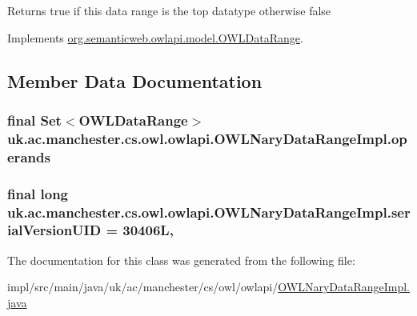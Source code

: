\begin{DoxyReturn}{Returns}
{\ttfamily true} if this data range is the top datatype otherwise {\ttfamily false} 
\end{DoxyReturn}


Implements \hyperlink{interfaceorg_1_1semanticweb_1_1owlapi_1_1model_1_1_o_w_l_data_range_aec7bb1cb42b7d8783e0410112734aa1c}{org.\-semanticweb.\-owlapi.\-model.\-O\-W\-L\-Data\-Range}.



\subsection{Member Data Documentation}
\hypertarget{classuk_1_1ac_1_1manchester_1_1cs_1_1owl_1_1owlapi_1_1_o_w_l_nary_data_range_impl_a4536392a3f3322085f03875bc3ac1ef1}{
\subsubsection[{operands}]{\setlength{\rightskip}{0pt plus 5cm}final Set$<${\bf O\-W\-L\-Data\-Range}$>$ uk.\-ac.\-manchester.\-cs.\-owl.\-owlapi.\-O\-W\-L\-Nary\-Data\-Range\-Impl.\-operands\hspace{0.3cm}{\ttfamily [private]}}}\label{classuk_1_1ac_1_1manchester_1_1cs_1_1owl_1_1owlapi_1_1_o_w_l_nary_data_range_impl_a4536392a3f3322085f03875bc3ac1ef1}
\hypertarget{classuk_1_1ac_1_1manchester_1_1cs_1_1owl_1_1owlapi_1_1_o_w_l_nary_data_range_impl_adf263be401e7e99a553ccb0cb28418ea}{
\subsubsection[{serial\-Version\-U\-I\-D}]{\setlength{\rightskip}{0pt plus 5cm}final long uk.\-ac.\-manchester.\-cs.\-owl.\-owlapi.\-O\-W\-L\-Nary\-Data\-Range\-Impl.\-serial\-Version\-U\-I\-D = 30406\-L\hspace{0.3cm}{\ttfamily [static]}, {\ttfamily [private]}}}\label{classuk_1_1ac_1_1manchester_1_1cs_1_1owl_1_1owlapi_1_1_o_w_l_nary_data_range_impl_adf263be401e7e99a553ccb0cb28418ea}


The documentation for this class was generated from the following file\-:\begin{DoxyCompactItemize}
\item 
impl/src/main/java/uk/ac/manchester/cs/owl/owlapi/\hyperlink{_o_w_l_nary_data_range_impl_8java}{O\-W\-L\-Nary\-Data\-Range\-Impl.\-java}\end{DoxyCompactItemize}
